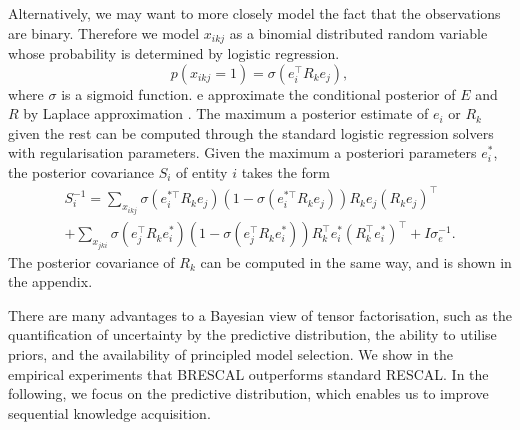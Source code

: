 Alternatively, we may want to more closely model the fact that the observations are binary.
Therefore we model $x_{ikj}$ as a binomial distributed random variable whose
probability is determined by logistic regression.
\[
p(x_{ikj}=1) = \sigma(e_i^{\top} R_k e_j),
\]
where $\sigma$ is a sigmoid function.
e approximate the conditional posterior of
$E$ and $R$ by Laplace approximation \cite{bishop2006pattern}. The maximum a
posterior estimate of $e_i$ or $R_k$ given the rest can be computed through the
standard logistic regression solvers with regularisation parameters. Given the
maximum a posteriori parameters $e_i^*$, the posterior covariance $S_i$ of entity
$i$ takes the form
\begin{align*}
S_i^{-1} = \sum_{x_{ikj}} \sigma(e_{i}^{*\top} R_k e_{j}) (1 - \sigma(e_{i}^{*\top} R_k e_{j})) R_k
e_{j}(R_k e_{j})^\top\\
 + \sum_{x_{jki}} \sigma(e_{j}^{\top} R_k e_{i}^*) ( 1- \sigma(e_{j}^{\top} R_k e_{i}^*)) R_k^\top e^*_{i}(R_k^\top e^*_{i})^\top + I\sigma_e^{-1}
.
\end{align*}
The posterior covariance of $R_k$ can be computed in the same way, and is shown in the appendix.

There are many advantages to a Bayesian view of tensor factorisation, such as
the quantification of uncertainty by the predictive distribution,
the ability to utilise priors, and
the availability of principled model selection.
We show in the empirical experiments that BRESCAL outperforms standard RESCAL.
In the following, we focus on the predictive distribution, which enables us to
improve sequential knowledge acquisition.
